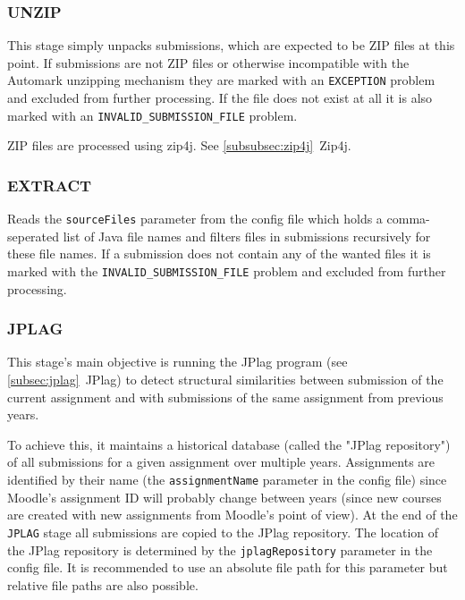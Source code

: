 \documentclass[12pt,a4paper,oneside]{report}
\begin{document}
	\subsubsection{UNZIP}
	This stage simply unpacks submissions, which are expected to be ZIP files at this point. If submissions are not ZIP files or otherwise incompatible with the Automark unzipping mechanism they are marked with an \lstinline|EXCEPTION| problem and excluded from further processing. If the file does not exist at all it is also marked with an \linebreak\lstinline|INVALID_SUBMISSION_FILE| problem.

	ZIP files are processed using zip4j. See \ref{subsubsec:zip4j}~Zip4j.

	\subsubsection{EXTRACT}
	Reads the \lstinline|sourceFiles| parameter from the config file which holds a comma-seperated list of Java file names and filters files in submissions recursively for these file names. If a submission does not contain any of the wanted files it is marked with the \linebreak\lstinline|INVALID_SUBMISSION_FILE| problem and excluded from further processing.

	\subsubsection{JPLAG} \label{subsubsec:jplag}
	This stage's main objective is running the JPlag program (see \ref{subsec:jplag}~JPlag) to detect structural similarities between submission of the current assignment and with submissions of the same assignment from previous years.

	To achieve this, it maintains a historical database (called the "JPlag repository") of all submissions for a given assignment over multiple years. Assignments are identified by their name (the \lstinline|assignmentName| parameter in the config file) since Moodle's assignment ID will probably change between years (since new courses are created with new assignments from Moodle's point of view). At the end of the \lstinline|JPLAG| stage all submissions are copied to the JPlag repository. The location of the JPlag repository is determined by the \lstinline|jplagRepository| parameter in the config file. It is recommended to use an absolute file path for this parameter but relative file paths are also possible.
\end{document}
